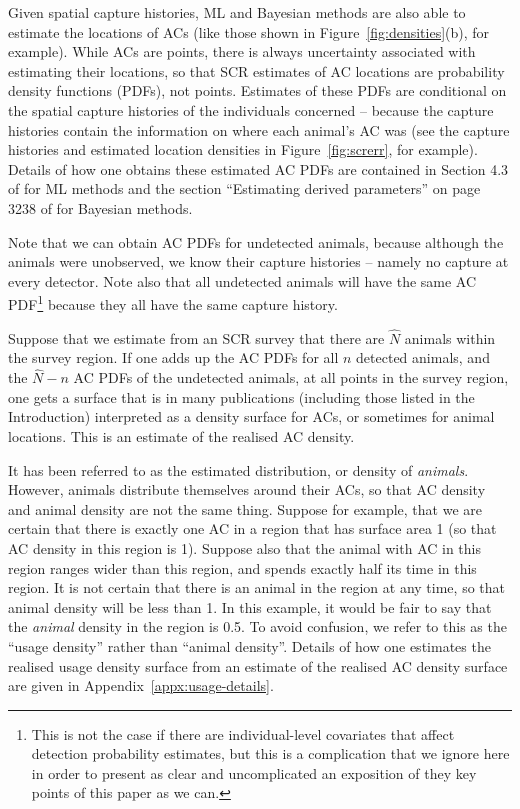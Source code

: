 \documentclass[10pt,a4paper]{article}
\begin{document}
Given spatial capture histories, ML and Bayesian methods are also able to estimate the locations of ACs (like those shown in Figure~\ref{fig:densities}(b), for example). While ACs are points, there is always uncertainty associated with estimating their locations, so that SCR estimates of AC locations are probability density functions (PDFs), not points. Estimates of these PDFs are conditional on the spatial capture histories of the individuals concerned -- because the capture histories contain the information on where each animal's AC was (see the capture histories and estimated location densities in Figure~\ref{fig:screrr}, for example). Details of how one obtains these estimated AC PDFs are contained in Section 4.3 of \cite{Borchers+Efford:08} for ML methods and the section ``Estimating derived parameters'' on page 3238 of \cite{Royle+al:09b} for Bayesian methods.

Note that we can obtain AC PDFs for undetected animals, because although the animals were unobserved, we know their capture histories -- namely no capture at every detector. Note also that all undetected animals will have the same AC PDF\footnote{This is not the case if there are individual-level covariates that affect detection probability estimates, but this is a complication that we ignore here in order to present as clear and uncomplicated an exposition of they key points of this paper as we can.} because they all have the same capture history. 

Suppose that we estimate from an SCR survey that there are $\hat{N}$ animals within the survey region. If one adds up the AC PDFs for all $n$ detected animals, and the $\hat{N}-n$ AC PDFs of the undetected animals, at all points in the survey region, one gets a surface that is in many publications (including those listed in the Introduction) interpreted as a density surface for ACs, or sometimes for animal locations. This is an estimate of the realised AC density.

It has been referred to as the estimated distribution, or density of \textit{animals}. However, animals distribute themselves around their ACs, so that AC density and animal density are not the same thing. Suppose for example, that we are certain that there is exactly one AC in a region that has surface area 1 (so that AC density in this region is 1). Suppose also that the animal with AC in this region ranges wider than this region, and spends exactly half its time in this region. It is not certain that there is an animal in the region at any time, so that animal density will be less than 1. In this example, it would be fair to say that the \textit{animal} density in the region is 0.5. To avoid confusion, we refer to this as the ``usage density'' rather than ``animal density''. Details of how one estimates the realised usage density surface from an estimate of the realised AC density surface are given in Appendix~\ref{appx:usage-details}.
\end{document}
